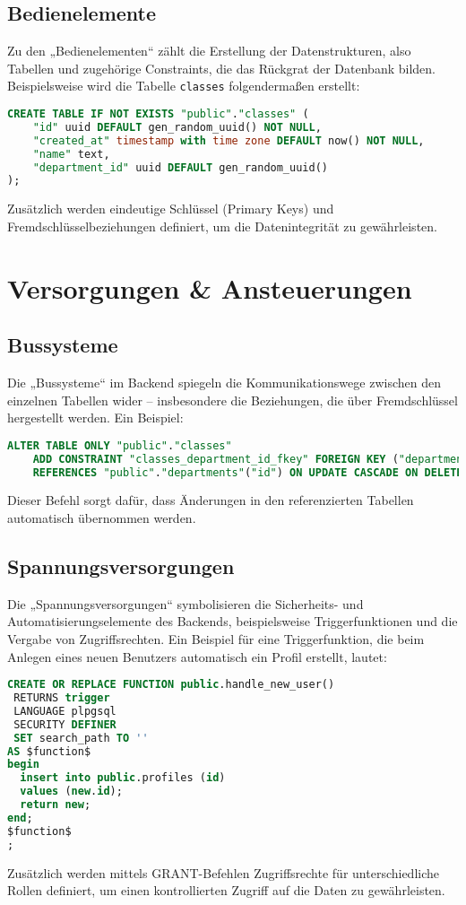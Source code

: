 \begin{inhalt}
\subsection{Bedienelemente}
Zu den „Bedienelementen“ zählt die Erstellung der Datenstrukturen, also Tabellen und zugehörige Constraints, die das Rückgrat der Datenbank bilden. Beispielsweise wird die Tabelle \texttt{classes} folgendermaßen erstellt:
\begin{lstlisting}[language=SQL, caption=Erstellung der Tabelle "classes"]
CREATE TABLE IF NOT EXISTS "public"."classes" (
    "id" uuid DEFAULT gen_random_uuid() NOT NULL,
    "created_at" timestamp with time zone DEFAULT now() NOT NULL,
    "name" text,
    "department_id" uuid DEFAULT gen_random_uuid()
);
\end{lstlisting}
Zusätzlich werden eindeutige Schlüssel (Primary Keys) und Fremdschlüsselbeziehungen definiert, um die Datenintegrität zu gewährleisten.

\section{Versorgungen \& Ansteuerungen}

\subsection{Bussysteme}
Die „Bussysteme“ im Backend spiegeln die Kommunikationswege zwischen den einzelnen Tabellen wider – insbesondere die Beziehungen, die über Fremdschlüssel hergestellt werden. Ein Beispiel:
\begin{lstlisting}[language=SQL, caption=Definition eines Fremdschlüssels]
ALTER TABLE ONLY "public"."classes"
    ADD CONSTRAINT "classes_department_id_fkey" FOREIGN KEY ("department_id")
    REFERENCES "public"."departments"("id") ON UPDATE CASCADE ON DELETE CASCADE;
\end{lstlisting}
Dieser Befehl sorgt dafür, dass Änderungen in den referenzierten Tabellen automatisch übernommen werden.

\subsection{Spannungsversorgungen}
Die „Spannungsversorgungen“ symbolisieren die Sicherheits- und Automatisierungselemente des Backends, beispielsweise Triggerfunktionen und die Vergabe von Zugriffsrechten. Ein Beispiel für eine Triggerfunktion, die beim Anlegen eines neuen Benutzers automatisch ein Profil erstellt, lautet:
\begin{lstlisting}[language=SQL, caption=Triggerfunktion handle_new_user()]
CREATE OR REPLACE FUNCTION public.handle_new_user()
 RETURNS trigger
 LANGUAGE plpgsql
 SECURITY DEFINER
 SET search_path TO ''
AS $function$
begin
  insert into public.profiles (id)
  values (new.id);
  return new;
end;
$function$
;
\end{lstlisting}
Zusätzlich werden mittels GRANT-Befehlen Zugriffsrechte für unterschiedliche Rollen definiert, um einen kontrollierten Zugriff auf die Daten zu gewährleisten.


\end{inhalt}
